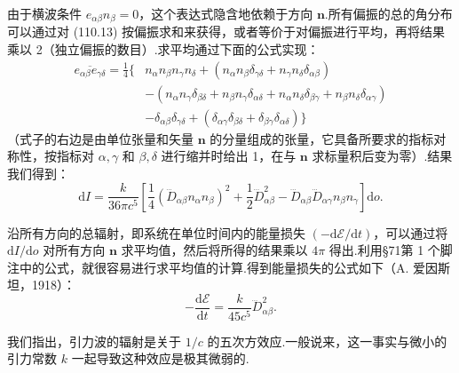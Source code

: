 由于横波条件 $e_{\alpha\beta}n_{\beta}=0$，这个表达式隐含地依赖于方向 $\boldsymbol{n}$.所有偏振的总的角分布可以通过对 (110.13) 按偏振求和来获得，或者等价于对偏振进行平均，再将结果乘以 2（独立偏振的数目）.求平均通过下面的公式实现：
\begin{equation}
\begin{aligned}
  \overline{e_{\alpha\beta}e_{\gamma\delta}}
  =\frac{1}{4}\bigl\{&n_{\alpha}n_{\beta}n_{\gamma}n_{\delta}
  +(n_{\alpha}n_{\beta}\delta_{\gamma\delta}
  +n_{\gamma}n_{\delta}\delta_{\alpha\beta})\\
  &-(n_{\alpha}n_{\gamma}\delta_{\beta\delta}
  +n_{\beta}n_{\gamma}\delta_{\alpha\delta}
  +n_{\alpha}n_{\delta}\delta_{\beta\gamma}
  +n_{\beta}n_{\delta}\delta_{\alpha\gamma})\\
  &-\delta_{\alpha\beta}\delta_{\gamma\delta}
  +(\delta_{\alpha\gamma}\delta_{\beta\delta}
  +\delta_{\beta\gamma}\delta_{\alpha\delta})\bigr\}
\end{aligned}
\end{equation}
（式子的右边是由单位张量和矢量 $\boldsymbol{n}$ 的分量组成的张量，它具备所要求的指标对称性，按指标对 $\alpha,\gamma$ 和 $\beta,\delta$ 进行缩并时给出 1，在与 $\boldsymbol{n}$ 求标量积后变为零）.结果我们得到：
\begin{equation}
  \mathrm{d}I=\frac{k}{36\pi c^{5}}
  \left[\frac{1}{4}(\dddot{D}_{\alpha\beta}n_{\alpha}n_{\beta})^{2}
  +\frac{1}{2}\dddot{D}_{\alpha\beta}^{2}
  -\dddot{D}_{\alpha\beta}\dddot{D}_{\alpha\gamma}n_{\beta}n_{\gamma}\right]
  \mathrm{d}o.
\end{equation}

沿所有方向的总辐射，即系统在单位时间内的能量损失 $(-\mathrm{d}\mathcal{E}/\mathrm{d}t)$，可以通过将 $\mathrm{d}I/\mathrm{d}o$ 对所有方向 $\boldsymbol{n}$ 求平均值，然后将所得的结果乘以 $4\pi$ 得出.利用§71第 1 个脚注中的公式，就很容易进行求平均值的计算.得到能量损失的公式如下（A. 爱因斯坦，1918）：
\begin{equation}
  -\frac{\mathrm{d}\mathcal{E}}{\mathrm{d}t}
  =\frac{k}{45c^{5}}\dddot{D}_{\alpha\beta}^{2}.
\end{equation}

我们指出，引力波的辐射是关于 $1/c$ 的五次方效应.一般说来，这一事实与微小的引力常数 $k$ 一起导致这种效应是极其微弱的.

